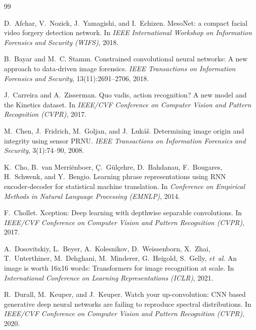 \documentclass[10pt,twocolumn,letterpaper]{article}
\newcommand{\etal}{\textit{et~al.}}
\begin{document}
\begin{thebibliography}{99}
\small

D.~Afchar, V.~Nozick, J.~Yamagishi, and I.~Echizen.
\newblock Meso{N}et: a compact facial video forgery detection network.
\newblock In \emph{IEEE International Workshop on Information Forensics and Security (WIFS)}, 2018.

B.~Bayar and M.~C. Stamm.
\newblock Constrained convolutional neural networks: A new approach to data-driven image forensics.
\newblock \emph{IEEE Transactions on Information Forensics and Security}, 13(11):2691--2706, 2018.

J.~Carreira and A.~Zisserman.
\newblock Quo vadis, action recognition? {A} new model and the {K}inetics dataset.
\newblock In \emph{IEEE/CVF Conference on Computer Vision and Pattern Recognition (CVPR)}, 2017.

M.~Chen, J.~Fridrich, M.~Goljan, and J.~Luk{\'a}{\v{s}}.
\newblock Determining image origin and integrity using sensor {PRNU}.
\newblock \emph{IEEE Transactions on Information Forensics and Security}, 3(1):74--90, 2008.

K.~Cho, B.~van Merri{\"e}nboer, {\c{C}}.~G{\"u}l{\c{c}}ehre, D.~Bahdanau, F.~Bougares, H.~Schwenk, and Y.~Bengio.
\newblock Learning phrase representations using {RNN} encoder-decoder for statistical machine translation.
\newblock In \emph{Conference on Empirical Methods in Natural Language Processing (EMNLP)}, 2014.

F.~Chollet.
\newblock Xception: Deep learning with depthwise separable convolutions.
\newblock In \emph{IEEE/CVF Conference on Computer Vision and Pattern Recognition (CVPR)}, 2017.

A.~Dosovitskiy, L.~Beyer, A.~Kolesnikov, D.~Weissenborn, X.~Zhai, T.~Unterthiner, M.~Dehghani, M.~Minderer, G.~Heigold, S.~Gelly, \etal
\newblock An image is worth 16x16 words: Transformers for image recognition at scale.
\newblock In \emph{International Conference on Learning Representations (ICLR)}, 2021.

R.~Durall, M.~Keuper, and J.~Keuper.
\newblock Watch your up-convolution: {CNN} based generative deep neural networks are failing to reproduce spectral distributions.
\newblock In \emph{IEEE/CVF Conference on Computer Vision and Pattern Recognition (CVPR)}, 2020.


\end{thebibliography}
\end{document}
